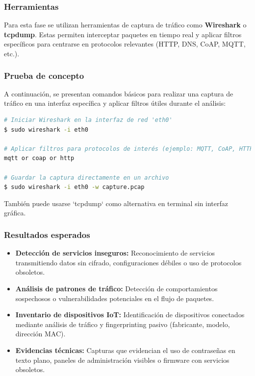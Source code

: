 \documentclass[a4paper, 11pt]{article}
\begin{document}
\subsubsection*{Herramientas}

Para esta fase se utilizan herramientas de captura de tráfico como \textbf{Wireshark} o \textbf{tcpdump}. Estas permiten interceptar paquetes en tiempo real y aplicar filtros específicos para centrarse en protocolos relevantes (HTTP, DNS, CoAP, MQTT, etc.).


\subsubsection*{Prueba de concepto}

A continuación, se presentan comandos básicos para realizar una captura de tráfico en una interfaz específica y aplicar filtros útiles durante el análisis:

\begin{lstlisting}[language=bash, style=terminalstyle, caption=Captura de tráfico con Wireshark]
# Iniciar Wireshark en la interfaz de red 'eth0'
$ sudo wireshark -i eth0

# Aplicar filtros para protocolos de interés (ejemplo: MQTT, CoAP, HTTP)
mqtt or coap or http

# Guardar la captura directamente en un archivo
$ sudo wireshark -i eth0 -w capture.pcap
\end{lstlisting}

También puede usarse `tcpdump` como alternativa en terminal sin interfaz gráfica.


\subsubsection*{Resultados esperados}

\begin{itemize}
    \item \textbf{Detección de servicios inseguros:} Reconocimiento de servicios transmitiendo datos sin cifrado, configuraciones débiles o uso de protocolos obsoletos.
    
    \item \textbf{Análisis de patrones de tráfico:} Detección de comportamientos sospechosos o vulnerabilidades potenciales en el flujo de paquetes.

    \item \textbf{Inventario de dispositivos IoT:} Identificación de dispositivos conectados mediante análisis de tráfico y fingerprinting pasivo (fabricante, modelo, dirección MAC).

    \item \textbf{Evidencias técnicas:} Capturas que evidencian el uso de contraseñas en texto plano, paneles de administración visibles o firmware con servicios obsoletos.

\end{itemize}
\end{document}
